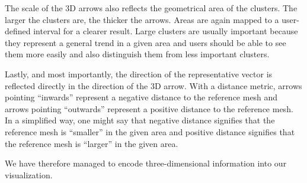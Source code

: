 The scale of the 3D arrows also reflects the geometrical area of the clusters. The larger the clusters are, the thicker the arrows. Areas are again mapped to a user-defined interval for a clearer result. Large clusters are usually important because they represent a general trend in a given area and users should be able to see them more easily and also distinguish them from less important clusters.

Lastly, and most importantly, the direction of the representative vector is reflected directly in the direction of the 3D arrow. With a distance metric, arrows pointing ``inwards'' represent a negative distance to the reference mesh and arrows pointing ``outwards'' represent a positive distance to the reference mesh. In a simplified way, one might say that negative distance signifies that the reference mesh is ``smaller'' in the given area and positive distance signifies that the reference mesh is ``larger'' in the given area.

We have therefore managed to encode three-dimensional information into our visualization.

